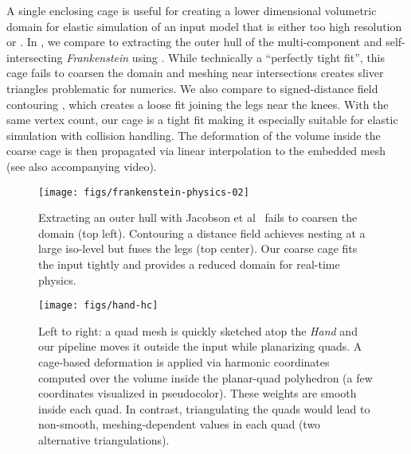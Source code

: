 A single enclosing cage is useful for creating a lower dimensional volumetric
domain for elastic simulation of an input model that is either too high
resolution or  \cite{Xu:2014:SDF}.
%
In , we compare to extracting the outer hull of
the multi-component and self-intersecting \emph{Frankenstein} using
\cite{Jacobson:WN:2013}.
%
While technically a ``perfectly tight fit'', this cage fails to coarsen the
domain and meshing near intersections creates sliver triangles problematic for
numerics.
%
We also compare to signed-distance field contouring \cite{Xu:2014:SDF}, which
creates a loose fit joining the legs near the knees.
%
With the same vertex count, our cage is a tight fit making it especially
suitable for elastic simulation with collision handling.
%
The deformation of the volume inside the coarse cage is then propagated via
linear interpolation to the embedded mesh (see also accompanying video).

\begin{figure}
  \texttt{[image: figs/frankenstein-physics-02]}
  \caption{Extracting an outer hull with Jacobson et al~\protect{} fails to coarsen the domain (top
  left). Contouring a distance field achieves nesting at a large
  iso-level but fuses the legs (top center). Our coarse cage fits the input
  tightly and provides a reduced domain for real-time physics.}
  \label{fig:frankenstein-physics}
\end{figure}

\begin{figure}
  \texttt{[image: figs/hand-hc]}
  \caption{Left to right: a quad mesh is quickly sketched atop the \emph{Hand}
  and our pipeline moves it outside the input while planarizing quads. A
  cage-based deformation is applied via harmonic coordinates computed over the
  volume inside the planar-quad polyhedron (a few coordinates visualized in
  pseudocolor). These weights are smooth inside each quad. In contrast,
  triangulating the quads would lead to non-smooth, meshing-dependent values in
  each quad (two alternative triangulations).}
  \label{fig:hand-hc}
\end{figure}

